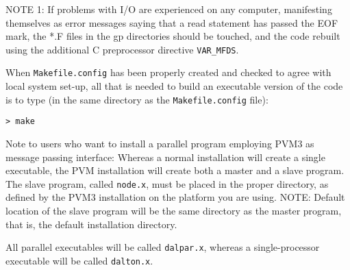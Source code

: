 NOTE 1: If problems with I/O are experienced on
any computer,
manifesting themselves as error messages saying that a read statement
has passed the EOF mark, the *.F files in the gp directories should be
touched, and the code rebuilt using the additional C preprocessor
directive \verb|VAR_MFDS|.

When  \verb|Makefile.config| has been properly
created and checked
to agree with local system set-up, all that is needed
to build an executable version of the
code is to type
(in the same directory as the \verb|Makefile.config| file):
\begin{verbatim}
> make
\end{verbatim}
Note to users who want to install a parallel program employing PVM3
as message passing interface: Whereas a normal installation will
create a single executable, the PVM installation will
create both a master and a slave
program.
The slave program, called \verb|node.x|, must be placed in  the
proper directory, as defined by the PVM3 installation on the
platform you are using. NOTE: Default location of the slave program
will be the same directory as the master program, that is, the default
installation directory.

All parallel executables will be called \verb|dalpar.x|, whereas a
single-processor executable will be called \verb|dalton.x|.
